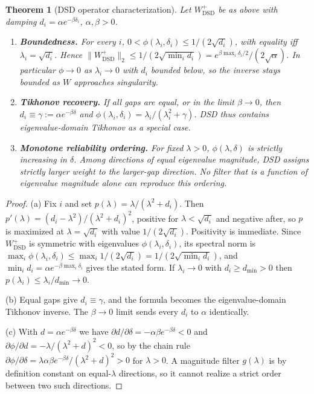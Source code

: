 \documentclass[preprint,12pt]{elsarticle}
\newtheorem{theorem}{Theorem}
\begin{document}
\begin{theorem}[DSD operator characterization]
\label{thm:char}
Let $W^{+}_{\mathrm{DSD}}$ be as above with damping $d_i = \alpha e^{-\beta \delta_i}$, $\alpha,\beta>0$.
\begin{enumerate}
\item[(a)] \textbf{Boundedness.} For every $i$, $0 < \phi(\lambda_i,\delta_i) \le 1/(2\sqrt{d_i})$,
with equality iff $\lambda_i = \sqrt{d_i}$. Hence
$\|W^{+}_{\mathrm{DSD}}\|_2 \le 1/(2\sqrt{\min_i d_i}) = e^{\beta \max_i \delta_i / 2}/(2\sqrt{\alpha})$.
In particular $\phi \to 0$ as $\lambda_i \to 0$ with $d_i$ bounded below, so the inverse stays bounded
as $W$ approaches singularity.
\item[(b)] \textbf{Tikhonov recovery.} If all gaps are equal, or in the limit $\beta \to 0$, then
$d_i \equiv \gamma := \alpha e^{-\beta \delta}$ and $\phi(\lambda_i,\delta_i) = \lambda_i/(\lambda_i^2+\gamma)$.
DSD thus contains eigenvalue-domain Tikhonov as a special case.
\item[(c)] \textbf{Monotone reliability ordering.} For fixed $\lambda>0$, $\phi(\lambda,\delta)$ is
strictly increasing in $\delta$. Among directions of equal eigenvalue magnitude, DSD assigns strictly
larger weight to the larger-gap direction. No filter that is a function of eigenvalue magnitude alone
can reproduce this ordering.
\end{enumerate}
\end{theorem}

\begin{proof}
(a) Fix $i$ and set $p(\lambda)=\lambda/(\lambda^2+d_i)$. Then
$p'(\lambda)=(d_i-\lambda^2)/(\lambda^2+d_i)^2$, positive for $\lambda<\sqrt{d_i}$ and negative after,
so $p$ is maximized at $\lambda=\sqrt{d_i}$ with value $1/(2\sqrt{d_i})$. Positivity is immediate.
Since $W^{+}_{\mathrm{DSD}}$ is symmetric with eigenvalues $\phi(\lambda_i,\delta_i)$, its spectral
norm is $\max_i \phi(\lambda_i,\delta_i) \le \max_i 1/(2\sqrt{d_i}) = 1/(2\sqrt{\min_i d_i})$, and
$\min_i d_i = \alpha e^{-\beta \max_i \delta_i}$ gives the stated form. If $\lambda_i \to 0$ with
$d_i \ge d_{\min}>0$ then $p(\lambda_i) \le \lambda_i/d_{\min} \to 0$.

(b) Equal gaps give $d_i \equiv \gamma$, and the formula becomes the eigenvalue-domain Tikhonov
inverse. The $\beta\to0$ limit sends every $d_i$ to $\alpha$ identically.

(c) With $d=\alpha e^{-\beta\delta}$ we have $\partial d/\partial \delta = -\alpha\beta e^{-\beta\delta}<0$
and $\partial \phi/\partial d = -\lambda/(\lambda^2+d)^2 < 0$, so by the chain rule
$\partial \phi/\partial \delta = \lambda\alpha\beta e^{-\beta\delta}/(\lambda^2+d)^2 > 0$ for
$\lambda>0$. A magnitude filter $g(\lambda)$ is by definition constant on equal-$\lambda$ directions,
so it cannot realize a strict order between two such directions.
\end{proof}
\end{document}
